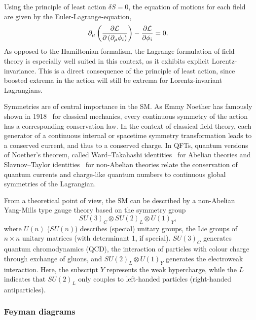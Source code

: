 Using the principle of least action $\delta S = 0$, the equation of motions for each field are given by the Euler-Lagrange-equation,
\begin{equation}
	\partial_\mu\left(\frac{\partial\mathcal{L}}{\partial\left(\partial_\mu\phi_i\right)}\right)-\frac{\partial\mathcal{L}}{\partial\phi_i}=0.
	\label{eq:euler_lagrange}
\end{equation}
As opposed to the Hamiltonian formalism, the Lagrange formulation of field theory is especially well suited in this context, as it exhibits explicit Lorentz-invariance. This is a direct consequence of the principle of least action, since boosted extrema in the action will still be extrema for Lorentz-invariant Lagrangians.


Symmetries are of central importance in the SM. As Emmy Noether has famously shown in 1918~\cite{physics/0503066} for classical mechanics, every continuous symmetry of the action has a corresponding conservation law. In the context of classical field theory, each generator of a continuous internal or spacetime symmetry transformation leads to a conserved current, and thus to a conserved charge. In QFTs, quantum versions of Noether's theorem, called Ward–Takahashi identities~\cite{PhysRev.78.182,Takahashi1957} for Abelian theories and Slavnov–Taylor identities~\cite{THOOFT1971173,TAYLOR1971436,Slavnov1972} for non-Abelian theories relate the conservation of quantum currents and charge-like quantum numbers to continuous global symmetries of the Lagrangian.

From a theoretical point of view, the SM can be described by a non-Abelian Yang-Mills type  gauge theory based on the symmetry group
\begin{equation*}
	SU(3)_C \otimes SU(2)_L \otimes U(1)_Y,
\end{equation*}
where $U(n)$ ($SU(n)$) describes (special) unitary groups, \ie the Lie groups of $n\times n$ unitary matrices (with determinant 1, if special). $SU(3)_C$ generates quantum chromodynamics (QCD), \ie the interaction of particles with colour charge through exchange of gluons, and $SU(2)_L \otimes U(1)_Y$ generates the electroweak interaction. Here, the subscript $Y$ represents the weak hypercharge, while the $L$ indicates that $SU(2)_L$ only couples to left-handed particles (right-handed antiparticles).

\subsubsection{Feyman diagrams}

